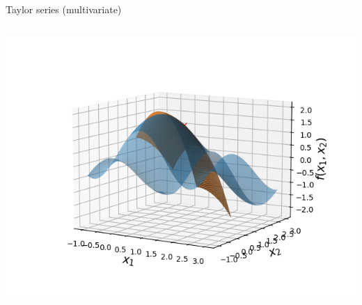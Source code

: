 \begin{vbframe}{Taylor series (multivariate)}
\begin{columns}
\begin{column}{0.48\textwidth}
      \includegraphics[width = \textwidth]{figure_man/Taylor2D/Taylor2D_2nd-301.png}
    \end{column}
  \end{columns}
  
  
  \end{vbframe}



  \endlecture
